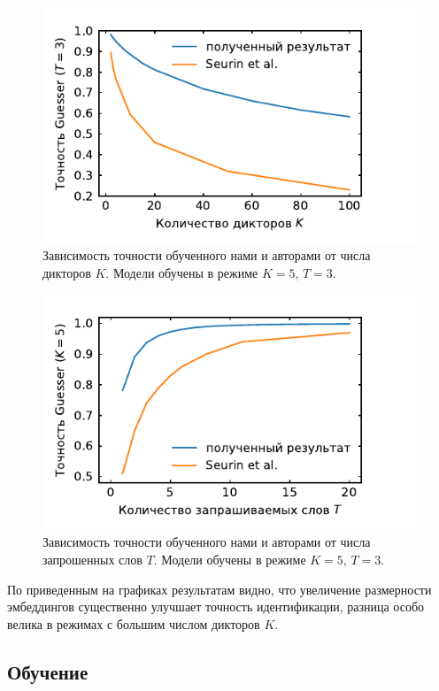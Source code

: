 \begin{figure}[htb]
    \centering
    \includegraphics[scale=1.0]{../plots/guest_sweep.pdf}
    \caption{Зависимость точности \guesser{} обученного нами и авторами
    \citeisr{} от числа дикторов $K$. Модели обучены в режиме $K = 5$, $T = 3$.}
\end{figure}

\begin{figure}[htb]
    \centering
    \includegraphics[scale=1.0]{../plots/word_sweep.pdf}
    \caption{Зависимость точности \guesser{} обученного нами и авторами
    \citeisr{} от числа запрошенных слов $T$. Модели обучены в режиме $K = 5$,
    $T = 3$.}
\end{figure}

По приведенным на графиках результатам видно, что увеличение размерности
эмбеддингов существенно улучшает точность идентификации, разница особо
велика в режимах с большим числом дикторов $K$.

\subsection{Обучение \enquirer{}}

